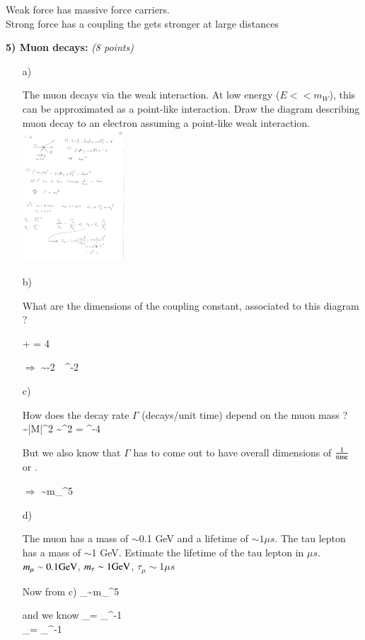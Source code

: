 {\bc
Weak force has massive force carriers.\\
Strong force has a coupling the gets stronger at large distances
\ec


\clearpage

\textbf{5) Muon decays: } \hfill \textit{(8 points)}\\
\begin{itemize}
  \item[a)]{ The muon decays via the weak interaction.  At low energy ($E << m_W$), this can be approximated as a point-like interaction. 
  Draw the diagram describing muon decay to an electron assuming a point-like weak interaction. 
\bc
\includegraphics[width=0.3\textwidth]{./4pointInteraction.pdf}
\ec

}
  \item[b)]{What are the dimensions of the coupling constant, associated to this diagram  ?

 \times {} +  = 4
\ee

$\Rightarrow$
\be
  \sim  -2\ \ \GeV^{-2}
\ee

  }
  \item[c)]{ How does the decay rate $\Gamma$ (decays/unit time)  depend on the muon mass ? 
\be
\Gamma \sim |M|^2 \sim  {}^2 = \GeV^{-4}
\ee

But we also know that $\Gamma$ has to come out to have overall dimensions of $\frac{1}{\textrm{time}}$ or \GeV.

$\Rightarrow$  
\be
\Gamma \sim m_\mu^5
\ee
}
  \item[d)]{ The muon has a mass of $\sim$0.1 GeV and a lifetime of $\sim 1 \mu s$. The tau lepton has a mass of {$\sim$1 GeV}. Estimate the lifetime of the tau lepton in $\mu s$.
$m_\mu \sim 0.1 \textrm{GeV}$, $m_\tau \sim 1 \textrm{GeV}$, $\tau_\mu \sim 1\mu s$

Now from c) 
\be
\Gamma_\tau \sim m_\tau^5
\ee

and we know
\bea
\tau_\mu = \Gamma_\mu^{-1}\\
\tau_\tau = \Gamma_\tau^{-1}
\eea

}
\end{itemize}}
